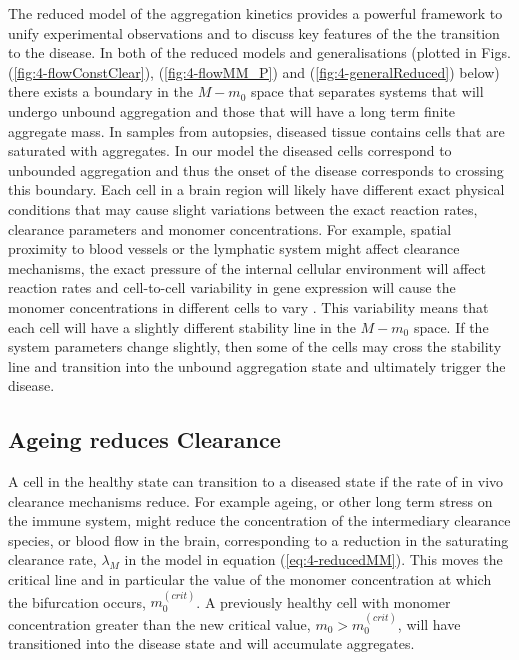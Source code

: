 The reduced model of the aggregation kinetics provides a powerful framework to unify experimental observations and to discuss key features of the the transition to the disease. In both of the reduced models and generalisations (plotted in Figs. (\ref{fig:4-flowConstClear}), (\ref{fig:4-flowMM_P}) and  (\ref{fig:4-generalReduced}) below) there exists a boundary in the $M-m_0$ space that separates systems that will undergo unbound aggregation and those that will have a long term finite aggregate mass. In samples from autopsies, diseased tissue contains cells that are saturated with aggregates. In our model the diseased cells correspond to unbounded aggregation and thus the onset of the disease corresponds to crossing this boundary.   Each cell in a brain region will likely have different exact physical conditions that may cause slight variations between the exact reaction rates, clearance parameters and monomer concentrations. For example, spatial proximity to blood vessels or the lymphatic system might affect clearance mechanisms, the exact pressure of the internal cellular environment will affect reaction rates and cell-to-cell variability in gene expression will cause the monomer concentrations in different cells to vary . This variability means that each cell will have a slightly different stability line in the $M-m_0$ space. If the system parameters change slightly, then some of the cells may cross the stability line and transition into the unbound aggregation state and ultimately trigger the disease.

\subsection{Ageing reduces Clearance}
\cite{keller_decreased_2000}
A cell in the healthy state can transition to a diseased state if the rate of in vivo clearance mechanisms reduce. For example ageing, or other long term stress on the immune system, might reduce the concentration of the intermediary clearance species, or blood flow in the brain, corresponding to a reduction in the saturating clearance rate, $\lambda_M$ in the model in equation (\ref{eq:4-reducedMM}). This moves the critical line and in particular the value of the monomer concentration at which the bifurcation occurs, $m_0^{(crit)}$. A previously healthy cell with monomer concentration greater than the new critical value, $m_0 > m_0^{(crit)}$, will have transitioned into the disease state and will accumulate aggregates.

